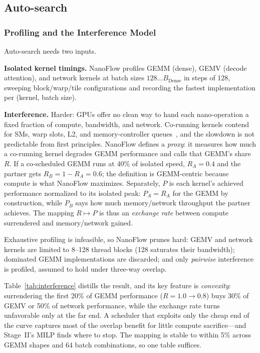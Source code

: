 \documentclass[manuscript,review]{acmart}
\newcommand{\nf}{NanoFlow\xspace}   %
\newcommand{\Bdense}{B_{\mathrm{Dense}}}
\begin{document}
\subsection{Auto-search}
\label{sec:autosearch}

\subsubsection{Profiling and the Interference Model}

Auto-search needs two inputs.

\textbf{Isolated kernel timings.} \nf profiles GEMM (dense), GEMV (decode attention), and network kernels at 
batch sizes $128 \ldots \Bdense$ in steps of 128, sweeping block/warp/tile configurations and recording the 
fastest implementation per (kernel, batch size).

\textbf{Interference.} Harder: GPUs offer no clean way to hand each nano-operation a fixed fraction of compute, 
bandwidth, and network. Co-running kernels contend for SMs, warp slots, L2, and memory-controller 
queues~\cite{strati2024orion}, and the slowdown is not predictable from first principles. \nf defines a 
\emph{proxy}: it measures how much a co-running kernel degrades GEMM performance and calls that GEMM's 
share $R$. If a co-scheduled GEMM runs at 40\% of isolated speed, $R_A = 0.4$ and the partner gets 
$R_B = 1 - R_A = 0.6$; the definition is GEMM-centric because compute is what \nf maximizes. Separately, 
$P$ is each kernel's achieved performance normalized to its isolated peak: $P_A = R_A$ for the GEMM by 
construction, while $P_B$ says how much memory/network throughput the partner achieves. The mapping 
$R \mapsto P$ is thus an \emph{exchange rate} between compute surrendered and memory/network gained.

Exhaustive profiling is infeasible, so \nf prunes hard: GEMV and network kernels are limited to 8--128 thread 
blocks (128 saturates their bandwidth); dominated GEMM implementations are discarded; and only \emph{pairwise} 
interference is profiled, assumed to hold under three-way overlap.

Table~\ref{tab:interference} distills the result, and its key feature is \emph{convexity}: surrendering the 
first 20\% of GEMM performance ($R = 1.0 \to 0.8$) buys 30\% of GEMV or 50\% of network performance, while the 
exchange rate turns unfavorable only at the far end. A scheduler that exploits only the cheap end of the curve 
captures most of the overlap benefit for little compute sacrifice---and Stage~II's MILP finds where to stop. 
The mapping is stable to within 5\% across GEMM shapes and 64 batch combinations, so one table suffices.
\end{document}
